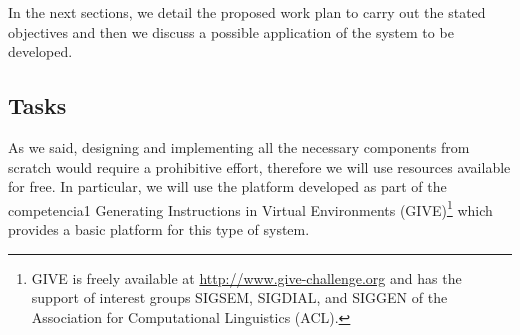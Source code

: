 

In the next sections, we detail the proposed work plan to carry out the stated
objectives and then we discuss a possible application of the system to be
developed. 

\subsection{Tasks}
% 

As we said, designing and implementing all the necessary components from scratch
would require a prohibitive effort, therefore we will use resources
available for free. In particular, we will use the platform developed as part of
the competencia1 Generating Instructions in Virtual Environments
(GIVE)\footnote{GIVE is freely available at \url{http://www.give-challenge.org}
and has the support of interest groups SIGSEM, SIGDIAL, and SIGGEN of the
Association for Computational Linguistics (ACL).} which provides a basic
platform for this type of system.


